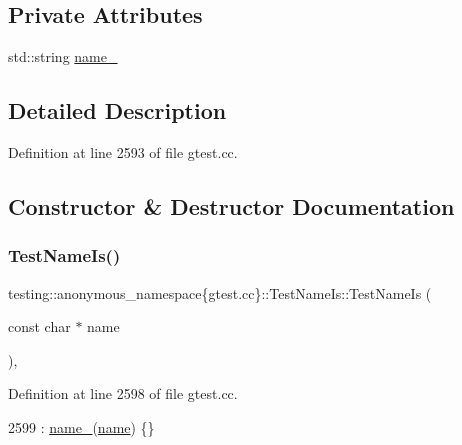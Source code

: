 \subsection*{Private Attributes}
\begin{DoxyCompactItemize}
\item 
std\+::string \hyperlink{classtesting_1_1anonymous__namespace_02gtest_8cc_03_1_1TestNameIs_a7e6936885d47805330525cc94e4a2f00}{name\+\_\+}
\end{DoxyCompactItemize}


\subsection{Detailed Description}


Definition at line 2593 of file gtest.\+cc.



\subsection{Constructor \& Destructor Documentation}
\mbox{\label{classtesting_1_1anonymous__namespace_02gtest_8cc_03_1_1TestNameIs_a4101ae9f7e7d6b80cf9445848e23b36e}} 
\subsubsection{\texorpdfstring{Test\+Name\+Is()}{TestNameIs()}}
{\footnotesize\ttfamily testing\+::anonymous\+\_\+namespace\{gtest.\+cc\}\+::Test\+Name\+Is\+::\+Test\+Name\+Is (\begin{DoxyParamCaption}\item[{const char $\ast$}]{name }\end{DoxyParamCaption})\hspace{0.3cm}{\ttfamily [inline]}, {\ttfamily [explicit]}}



Definition at line 2598 of file gtest.\+cc.


\begin{DoxyCode}
2599       : \hyperlink{classtesting_1_1anonymous__namespace_02gtest_8cc_03_1_1TestNameIs_a7e6936885d47805330525cc94e4a2f00}{name\_}(\hyperlink{namespaceinteractive__marker_a447655961b3d3ca3c5a2a9d3d769436d}{name}) \{\}
\end{DoxyCode}


